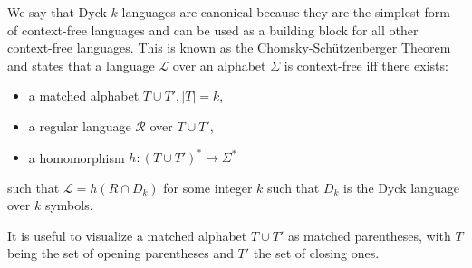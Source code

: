 We say that Dyck-$k$ languages are canonical because they are the simplest form of context-free languages and can be used as a building block 
for all other context-free languages. This is known as the Chomsky-Sch{\"u}tzenberger Theorem \cite{rozenberg1997handbook} and states that a language $\mathcal{L}$ over an alphabet $\Sigma$ is context-free iff there exists:
\begin{itemize}
    \item a matched alphabet $T \cup T', |T| = k$,
    \item a regular language $\mathcal{R}$ over $T \cup T'$,
    \item a homomorphism $h: {(T \cup T')}^* \rightarrow \Sigma^*$
\end{itemize}

such that $\mathcal{L} = h(R \cap D_k)$ for some integer $k$ such that $D_k$ is the Dyck language over $k$ symbols.

It is useful to visualize a matched alphabet  $T \cup T'$ as matched parentheses, with $T$ being the set of opening parentheses and $T'$ the set of closing ones.